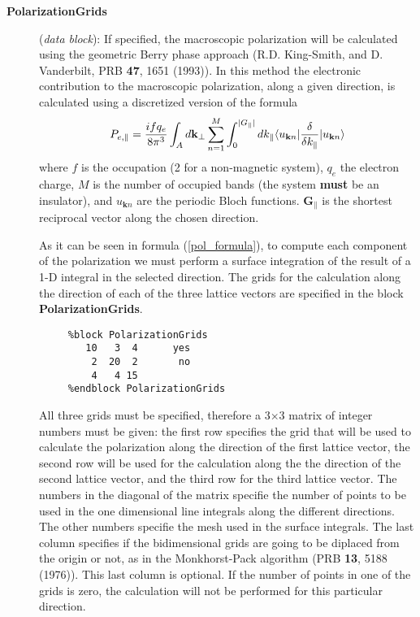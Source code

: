 \begin{description}

\item[\textbf{PolarizationGrids}] (\textit{data block}):
If specified, the macroscopic polarization will be calculated using the
geometric Berry phase approach (R.D. King-Smith, and D. Vanderbilt,
PRB \textbf{47}, 1651 (1993)). In this method the electronic
contribution to the macroscopic polarization, along a given direction,
is calculated using
a discretized version of the formula
\begin{equation}
\label{pol_formula}
    P_{e,\parallel}={ifq_e \over 8\pi^3} \int_A d\textbf{k}_\perp
    \sum_{n=1}^M \int_0^{|G_\parallel|} dk_{\parallel}
     \langle u_{\textbf{k} n} |{\delta \over \delta k_{\parallel}} |
      u_{\textbf{k} n} \rangle
\end{equation}
where $f$ is the occupation (2 for a non-magnetic system),
$q_e$ the electron charge, $M$ is the number of occupied bands (the
system \textbf{must} be an insulator), and $u_{\textbf{k} n}$ are
the periodic Bloch functions. $\textbf{G}_\parallel$ is the shortest
reciprocal vector along the chosen direction.

As it can be seen in formula (\ref{pol_formula}), to compute each
component of the polarization we must perform a surface integration
of the result of a 1-D integral in the selected direction.
The grids for the calculation along the direction of each of the
three lattice vectors are specified in the block
\textbf{PolarizationGrids}.
\begin{verbatim}
     %block PolarizationGrids
        10   3  4      yes
         2  20  2       no
         4   4 15
     %endblock PolarizationGrids
\end{verbatim}

All three grids must be specified, therefore a 3$\times$3 matrix of
integer numbers must be given: the first row specifies the grid that
will be used to calculate the polarization along the direction of the
first lattice vector, the second row will be used for the calculation
along the the direction of the second lattice vector, and the third
row for the third lattice vector.  The numbers in the diagonal of the
matrix specifie the number of points to be used in the one dimensional
line integrals along the different directions. The other numbers
specifie the mesh used in the surface integrals.  The last column
specifies if the bidimensional grids are going to be diplaced from the
origin or not, as in the Monkhorst-Pack algorithm (PRB \textbf{13}, 5188
(1976)).  This last column is optional.  If the number of points in
one of the grids is zero, the calculation will not be performed for
this particular direction.


\end{description}
